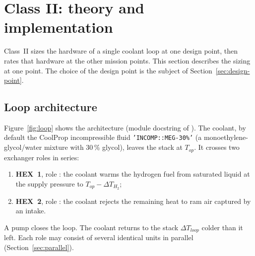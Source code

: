 \documentclass[a4paper,11pt]{article}
\begin{document}
\section{Class II: theory and implementation}\label{sec:class2}

Class~II sizes the hardware of a single coolant loop at one design point, then rates that
hardware at the other mission points. This section describes the sizing at one point. The
choice of the design point is the subject of Section~\ref{sec:design-point}.

\subsection{Loop architecture}\label{sec:architecture}
Figure~\ref{fig:loop} shows the architecture (module docstring of ). The
coolant, by default the CoolProp incompressible fluid \texttt{'INCOMP::MEG-30\%'} (a
monoethylene-glycol/water mixture with 30\,\% glycol), leaves the stack at $T_{op}$. It
crosses two exchanger roles in series:
\begin{enumerate}
\item \textbf{HEX~1}, role : the coolant warms the hydrogen fuel
  from saturated liquid at the supply pressure to $T_{op} - \Delta T_{H_2}$;
\item \textbf{HEX~2}, role : the coolant rejects the remaining
  heat to ram air captured by an intake.
\end{enumerate}
A pump closes the loop. The coolant returns to the stack $\Delta T_{loop}$ colder than it
left. Each role may consist of several identical units in parallel
(Section~\ref{sec:parallel}).
\end{document}
